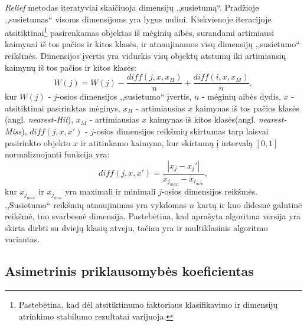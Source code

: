 \textit{Relief} metodas iteratyviai skaičiuoja dimensijų ,,susietumą``. Pradžioje
,,susietumas`` visoms dimensijoms yra lygus nuliui. Kiekvienoje
iteracijoje atsitiktinai\footnote{Pastebėtina, kad dėl atsitiktinumo faktoriaus klasifikavimo ir  dimensijų atrinkimo stabilumo
rezultatai varijuoja.} pasirenkamas objektas iš mėginių aibės, surandami
artimiausi kaimynai iš tos pačios ir kitos klasės, ir atnaujinamos visų 
dimensijų ,,susietumo`` reikšmės. Dimensijos įvertis yra vidurkis visų objektų
atstumų iki artimiausių kaimynų iš tos pačios ir kitos klasės:
\begin{equation}
 W(j)=W(j) - \frac{diff(j, x, x_H)}{n} + \frac{diff(i, x, x_M)}{n},
\end{equation}
kur 
$W(j)$ - $j$-osios dimensijos ,,susietumo`` įvertis, 
$n$ - mėginių aibės dydis, 
$x$ - atsitiktinai pasirinktas mėginys, 
$x_H$ - artimiausias $x$ kaimynas iš tos pačios klasės (angl. \textit{nearest-Hit}), 
$x_M$ - artimiausias $x$ kaimynas iš kitos klasės(angl. \textit{nearest-Miss}),
$diff(j, x, x')$ - $j$-osios dimensijos reikšmių skirtumas tarp laisvai pasirinkto objekto $x$ ir atitinkamo kaimyno, kur skirtumą į intervalą $[0, 1]$ normalizuojanti funkcija yra:
\begin{equation}
 diff(j, x, x')=\frac{|x_j- x_j'|}{x_{j_{max}} - x_{i_{min}}},
\end{equation}
kur $x_{j_{max}}$ ir $x_{j_{min}}$ yra maximali ir minimali $j$-osios dimensijos reikšmės. ,,Susietumo`` reikšmių atnaujinimas yra vykdomas $n$ kartų ir kuo didesnė galutinė reikšmė, tuo svarbesnė dimensija. Pastebėtina, kad aprašyta algoritma versija yra skirta dirbti su dviejų klasių atveju, tačiau yra ir multiklasinis algoritmo variantas.

\subsection{Asimetrinis priklausomybės koeficientas}

